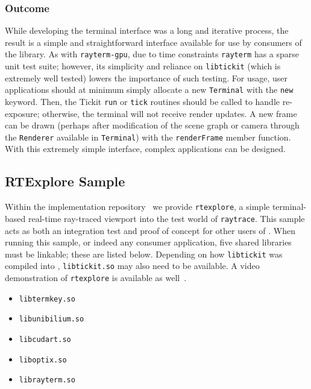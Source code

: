 \subsubsection{Outcome}
\label{ch:methods:interface:tickit:outcome}

While developing the terminal interface was a long and iterative process, the result is a simple and straightforward interface available for use by consumers of the \name{} library.
As with \texttt{rayterm-gpu}, due to time constraints \texttt{rayterm} has a sparse unit test suite; however, its simplicity and reliance on \texttt{libtickit} (which is extremely well tested) lowers the importance of such testing.
For usage, user applications should at minimum simply allocate a new \texttt{Terminal} with the \texttt{new} keyword.
Then, the Tickit \texttt{run} or \texttt{tick} routines should be called to handle re-exposure; otherwise, the terminal will not receive render updates.
A new frame can be drawn (perhaps after modification of the scene graph or camera through the \texttt{Renderer} available in \texttt{Terminal}) with the \texttt{renderFrame} member function.
With this extremely simple interface, complex applications can be designed.


\subsection{RTExplore Sample}
\label{ch:methods:interface:sample}

Within the \name{} implementation repository~\cite{raytermGpuImpl} we provide \texttt{rtexplore}, a simple terminal-based real-time ray-traced viewport into the test world of \texttt{raytrace}.
This sample acts as both an integration test and proof of concept for other users of \name{}.
When running this sample, or indeed any \name{} consumer application, five shared libraries must be linkable; these are listed below.
Depending on how \texttt{libtickit} was compiled into \name{}, \texttt{libtickit.so} may also need to be available.
A video demonstration of \texttt{rtexplore} is available as well~\cite{raytermDemo}.

\vspace{-0.5em}
\begin{itemize}
  \vspace{-0.5em}
  \item \texttt{libtermkey.so}
  \vspace{-0.5em}
  \item \texttt{libunibilium.so}
  \vspace{-0.5em}
  \item \texttt{libcudart.so}
  \vspace{-0.5em}
  \item \texttt{liboptix.so}
  \vspace{-0.5em}
  \item \texttt{librayterm.so}
  \vspace{-0.5em}
\end{itemize}
\vspace{-0.5em}

